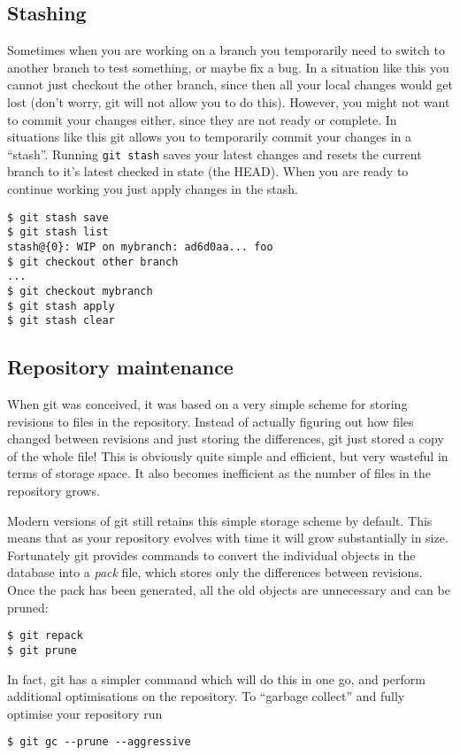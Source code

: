 \documentclass[a4paper,10pt]{article}
\begin{document}
\subsection{Stashing}
Sometimes when you are working on a branch you temporarily need to switch to
another branch to test something, or maybe fix a bug. In a situation like this
you cannot just checkout the other branch, since then all your local changes
would get lost (don't worry, git will not allow you to do this). However, you
might not want to commit your changes either, since they are not ready or
complete. In situations like this git allows you to temporarily commit your
changes in a ``stash''. Running \texttt{git stash} saves your latest changes
and resets the current branch to it's latest checked in state (the HEAD). When
you are ready to continue working you just apply changes in the stash.
\begin{verbatim}
$ git stash save
$ git stash list
stash@{0}: WIP on mybranch: ad6d0aa... foo
$ git checkout other branch
...
$ git checkout mybranch
$ git stash apply
$ git stash clear
\end{verbatim}


\subsection{Repository maintenance}
When git was conceived, it was based on a very simple scheme for storing
revisions to files in the repository. Instead of actually figuring out how
files changed between revisions and just storing the differences, git just
stored a copy of the whole file! This is obviously quite simple and efficient,
but very wasteful in terms of storage space. It also becomes inefficient as
the number of files in the repository grows. 

Modern versions of git still retains this simple storage scheme by default.
This means that as your repository evolves with time it will grow
substantially in size. Fortunately git provides commands to convert the
individual objects in the database into a \emph{pack} file, which stores only
the differences between revisions. Once the pack has been generated, all the
old objects are unnecessary and can be pruned:
\begin{verbatim}
$ git repack
$ git prune
\end{verbatim}
In fact, git has a simpler command which will do this in one go, and
perform additional optimisations on the repository. To ``garbage collect'' and
fully optimise your repository run
\begin{verbatim}
$ git gc --prune --aggressive
\end{verbatim}
\end{document}
